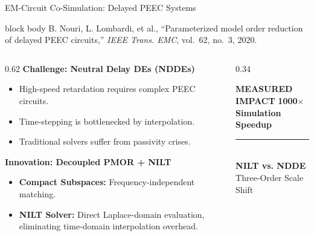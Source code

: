 \begin{frame}[t]{EM-Circuit Co-Simulation: Delayed PEEC Systems}
	\vspace{1ex}

	\begin{beamercolorbox}[wd=\textwidth, sep=1ex, rounded=true]{block body}
		\scriptsize B. Nouri, L. Lombardi, et al., ``Parameterized model order reduction of delayed PEEC circuits,'' \emph{IEEE Trans. EMC}, vol.~62, no.~3, 2020.
	\end{beamercolorbox}

	\vspace{2ex}

	\begin{columns}[T, onlytextwidth]
		\begin{column}{0.62\textwidth}
			\small
			\textbf{\textcolor{blue!80!black}{Challenge: Neutral Delay DEs (NDDEs)}}
			\begin{itemize}
				\item High-speed retardation requires complex PEEC circuits.
				\item Time-stepping is bottlenecked by interpolation.
				\item Traditional solvers suffer from passivity crises.
			\end{itemize}

			\vspace{2ex}
			\textbf{\textcolor{blue!80!black}{Innovation: Decoupled PMOR + NILT}}
			\begin{itemize}
				\item \textbf{Compact Subspaces:} Frequency-independent matching.
				\item \textbf{NILT Solver:} Direct Laplace-domain evaluation, eliminating time-domain interpolation overhead.
			\end{itemize}
		\end{column}

		\begin{column}{0.34\textwidth}
			\begin{alertblock}{\centering \textbf{MEASURED IMPACT}}
				\centering
				\vspace{1ex}
				{\huge \textbf{1000$\times$}} \\
				\footnotesize \textbf{Simulation Speedup} \\
				\vspace{1.5ex}
				\textcolor{red!20}{\rule{0.8\textwidth}{0.5pt}} \\
				\vspace{1.5ex}
				\small \textbf{NILT vs. NDDE} \\
				\footnotesize Three-Order Scale Shift
				\vspace{1ex}
			\end{alertblock}
		\end{column}
	\end{columns}


\end{frame}

